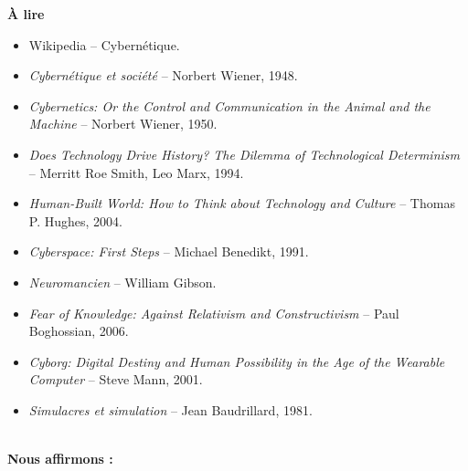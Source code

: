 \documentclass[11pt,twoside,a4paper]{book}
\begin{document}
\begin{multicols*}{2}
	\small
	\textbf{{\`A} lire}
	\begin{itemize}
		\setlength{\itemsep}{1pt}
		\setlength{\parskip}{0pt}
		\setlength{\parsep}{0pt}
		
		\item Wikipedia -- Cybern{\'e}tique.
		\item \emph{Cybern{\'e}tique et soci{\'e}t{\'e}} -- Norbert Wiener, 1948.
		\item \emph{Cybernetics: Or the Control and Communication in the Animal and the Machine} -- Norbert Wiener, 1950.
		\item \emph{Does Technology Drive History? The Dilemma of Technological Determinism} -- Merritt Roe Smith, Leo Marx, 1994.
		\item \emph{Human-Built World: How to Think about Technology and Culture} -- Thomas P. Hughes, 2004.
		\item \emph{Cyberspace: First Steps} -- Michael Benedikt, 1991.
		\item \emph{Neuromancien} -- William Gibson.
		\item \emph{Fear of Knowledge: Against Relativism and Constructivism} -- Paul Boghossian, 2006.
		\item \emph{Cyborg: Digital Destiny and Human Possibility in the Age of the Wearable Computer} -- Steve Mann, 2001.
		\item \emph{Simulacres et simulation} -- Jean Baudrillard, 1981.
	\end{itemize} ~\\
	
	\textbf{Nous affirmons :}
	\begin{itemize}
		\setlength{\itemsep}{1pt}
		\setlength{\parskip}{0pt}
		\setlength{\parsep}{0pt}
		

\end{itemize}
\end{multicols*}
\end{document}
